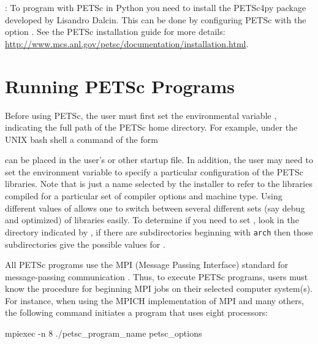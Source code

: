 : To program with PETSc in Python you need to install the PETSc4py package developed by
Lisandro Dalcin. This can be done by configuring PETSc with the option . See the PETSc installation guide
for more details:\\ \href{http://www.mcs.anl.gov/petsc/documentation/installation.html}{http://www.mcs.anl.gov/petsc/documentation/installation.html}.

\section{Running PETSc Programs}
\label{sec_running}

Before using PETSc, the user must first set the environmental variable
,  indicating the full path of the PETSc home
directory.  For example, under the UNIX bash shell a command of the form
 can be placed in the user's  or other startup file.  In addition, the user may need to set the environment
variable {} to specify a particular configuration of the PETSc libraries. Note that
{} is just a name selected by the installer to refer to
the libraries compiled for a particular set of compiler options and
machine type. Using different values of {} allows one to switch between
several different sets (say debug and optimized) of libraries easily. To determine if you need to set {},
look in the directory indicated by , if there are subdirectories beginning with {\tt arch} then those subdirectories give the
possible values for {}.

All PETSc programs use the MPI (Message Passing Interface) standard
for message-passing communication \cite{MPI-final}.  Thus, to execute
PETSc programs, users must know the procedure for beginning MPI jobs
on their selected computer system(s).  For instance, when using the
MPICH implementation of MPI \cite{mpich-web-page} and many others, the following
command initiates a program that uses eight processors:
 
\begin{bashlisting}
mpiexec -n 8 ./petsc_program_name petsc_options
\end{bashlisting}

